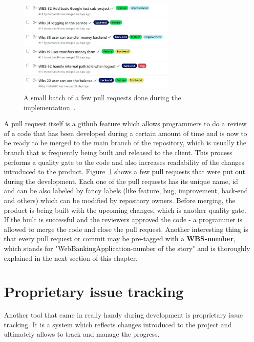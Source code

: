 \documentclass[a4paper,12pt]{book}
\newcommand\tab[1][1cm]{\hspace*{#1}}
\begin{document}
{\begin{figure}[H]
  \centering
    \includegraphics[width=0.7\textwidth]{pullrequests}
    \caption{A small batch of a few pull requests done during the implementation~\cite{repo}.}
    \label{fig:requests}
\end{figure} 
    
A pull request itself is a github feature which allows programmers to do a review of a code that has been developed during a certain amount of time and is now to be ready to be merged to the main branch of the repository, which is usually the branch that is frequently being built and released to the client. This process performs a quality gate to the code and also increases readability of the changes introduced to the product. Figure~\ref{fig:requests} shows a few pull requests that were put out during the development. Each one of the pull requests has its unique name, id and can be also labeled by fancy labels (like feature, bug, improvement, back-end and others) which can be modified by repository owners. Before merging, the product is being built with the upcoming changes, which is another quality gate. If the built is successful and the reviewers approved the code - a programmer is allowed to merge the code and close the pull request. Another interesting thing is that every pull request or commit may be pre-tagged with a \textbf{WBS-number}, which stands for "WebBankingApplication-number of the story" and is thoroughly explained in the next section of this chapter. 
}
\section{Proprietary issue tracking}
{
\tab Another tool that came in really handy during development is proprietary issue tracking. It is a system which reflects changes introduced to the project and ultimately allows to track and manage the progress. 
}
\end{document}
